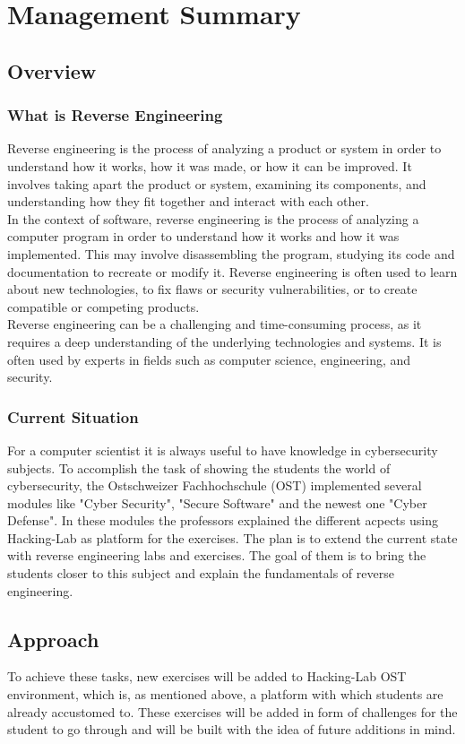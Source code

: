 \chapter{Management Summary}
\section{Overview}
\subsection{What is Reverse Engineering}
Reverse engineering is the process of analyzing a product or system in order to understand how it works, how it was made, or how it can be improved. It involves taking apart the product or system, examining its components, and understanding how they fit together and interact with each other. \\
In the context of software, reverse engineering is the process of analyzing a computer program in order to understand how it works and how it was implemented. This may involve disassembling the program, studying its code and documentation to recreate or modify it. Reverse engineering is often used to learn about new technologies, to fix flaws or security vulnerabilities, or to create compatible or competing products. \\
Reverse engineering can be a challenging and time-consuming process, as it requires a deep understanding of the underlying technologies and systems. It is often used by experts in fields such as computer science, engineering, and security. 

\subsection{Current Situation}
For a computer scientist it is always useful to have knowledge in cybersecurity subjects. To accomplish the task of showing the students the world of cybersecurity, the Ostschweizer Fachhochschule (OST) implemented several modules like "Cyber Security", "Secure Software" and the newest one "Cyber Defense". In these modules the professors explained the different acpects using Hacking-Lab as platform for the exercises. The plan is to extend the current state with reverse engineering labs and exercises. The goal of them is to bring the students closer to this subject and explain the fundamentals of reverse engineering.

\section{Approach}
To achieve these tasks, new exercises will be added to Hacking-Lab OST environment, which is, as mentioned above, a platform with which students are already accustomed to. These exercises will be added in form of challenges for the student to go through and will be built with the idea of future additions in mind.

